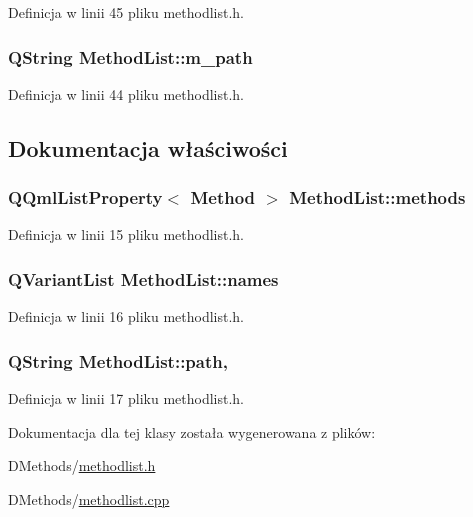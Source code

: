 Definicja w linii 45 pliku methodlist.\-h.

\hypertarget{class_method_list_a1586bb53f50209dc1adf309bcb5a4cd2}{
\subsubsection[{m\-\_\-path}]{\setlength{\rightskip}{0pt plus 5cm}Q\-String Method\-List\-::m\-\_\-path\hspace{0.3cm}{\ttfamily [private]}}}\label{class_method_list_a1586bb53f50209dc1adf309bcb5a4cd2}


Definicja w linii 44 pliku methodlist.\-h.



\subsection{Dokumentacja właściwości}
\hypertarget{class_method_list_a10fa462526af745e0ef24c024a7e252e}{
\subsubsection[{methods}]{\setlength{\rightskip}{0pt plus 5cm}Q\-Qml\-List\-Property$<$ {\bf Method} $>$ Method\-List\-::methods\hspace{0.3cm}{\ttfamily [read]}}}\label{class_method_list_a10fa462526af745e0ef24c024a7e252e}


Definicja w linii 15 pliku methodlist.\-h.

\hypertarget{class_method_list_ac96a3d7bc8ad7419795cf194448ca2c4}{
\subsubsection[{names}]{\setlength{\rightskip}{0pt plus 5cm}Q\-Variant\-List Method\-List\-::names\hspace{0.3cm}{\ttfamily [read]}}}\label{class_method_list_ac96a3d7bc8ad7419795cf194448ca2c4}


Definicja w linii 16 pliku methodlist.\-h.

\hypertarget{class_method_list_aac51cd62c2c4e2cfb7a4a8053555ea61}{
\subsubsection[{path}]{\setlength{\rightskip}{0pt plus 5cm}Q\-String Method\-List\-::path\hspace{0.3cm}{\ttfamily [read]}, {\ttfamily [write]}}}\label{class_method_list_aac51cd62c2c4e2cfb7a4a8053555ea61}


Definicja w linii 17 pliku methodlist.\-h.



Dokumentacja dla tej klasy została wygenerowana z plików\-:\begin{DoxyCompactItemize}
\item 
D\-Methods/\hyperlink{methodlist_8h}{methodlist.\-h}\item 
D\-Methods/\hyperlink{methodlist_8cpp}{methodlist.\-cpp}\end{DoxyCompactItemize}
